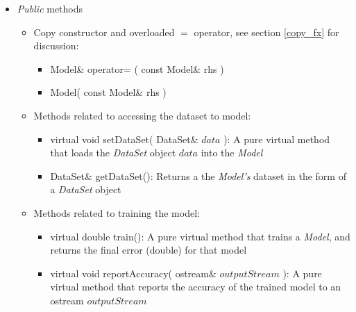 \documentclass{report}
\def\beginred{\color{red}}
\def\endcolor{\color{black}}
\begin{document}
\begin{itemize}

\item {\em Public} methods

\begin{itemize}

\item Copy constructor and overloaded $=$ operator, see section
\ref{copy_fx} for discussion:
\begin{itemize}
\item Model\& operator= ( const Model\& rhs )
\item Model( const Model\& rhs )
\end{itemize}

\item Methods related to accessing the dataset to model:
\begin{itemize}
\item \beginred virtual void setDataSet( DataSet\& $data$ ): A pure
      virtual method that loads the {\em DataSet} object $data$ into
      the {\em Model} \endcolor
\item DataSet\& getDataSet(): Returns a the {\em Model's} dataset in
      the form of a {\em DataSet} object
\end{itemize}

\item Methods related to training the model:
\begin{itemize}
\item \beginred virtual double train(): A pure virtual method that
      trains a {\em Model}, and returns the final error (double) for
      that model \endcolor
\item \beginred virtual void reportAccuracy( ostream\& $outputStream$
      ): A pure virtual method that reports the accuracy of the
      trained model to an ostream $outputStream$ \endcolor
\end{itemize}


\end{itemize}
\end{itemize}
\end{document}
